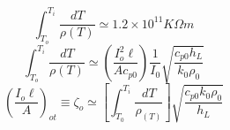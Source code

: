 \begin{equation}%
\int_{T_o}^{T_i}\frac{dT}{\rho(T)}\simeq1.2\times10^{11}K\Omega m
\end{equation}
\begin{equation}%
\int_{T_o}^{T_i}\frac{dT}{\rho(T)}\simeq(\frac{I_{o}^{2}\ell}{Ac_{p0}})\frac{1}{I_0}\sqrt{\frac{c_{p0}h_L}{k_0\rho_0}}
\end{equation}
\begin{equation}%
(\frac{I_o\ell}{A})_{ot} \equiv \zeta_o\simeq[\int_{T_0}^{T_i}\frac{dT}{\rho_(T)}]\sqrt{\frac{c_{p0}k_0 \rho_0}{h_L}}
\end{equation}





